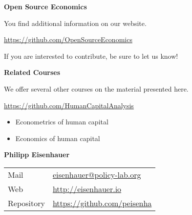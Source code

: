\begin{frame}
	\textbf{Open Source Economics}\vspace{0.3cm}

You find additional information on our website.

\begin{center}
\url{https://github.com/OpenSourceEconomics}
\end{center}

If you are interested to contribute, be sure to let us know!

\end{frame}
\begin{frame}
	\textbf{Related Courses}\vspace{0.3cm}

We offer several other courses on the material presented here.

	\begin{center}
	\url{https://github.com/HumanCapitalAnalysis}
	\end{center}


	\begin{itemize}\setlength\itemsep{1em}
	\item Econometrics of human capital
	\item Economics of human capital
	\end{itemize}

\end{frame}
\begin{frame}
\textbf{Philipp Eisenhauer}\\\vspace{0.5cm}
\begin{tabular}{ll}
Mail		& \href{mailto:eisenhauer@policy-lab.org}{eisenhauer@policy-lab.org}\\
Web     	& \url{http://eisenhauer.io} \\
Repository  & \url{https://github.com/peisenha}\\
\end{tabular}
\end{frame}
